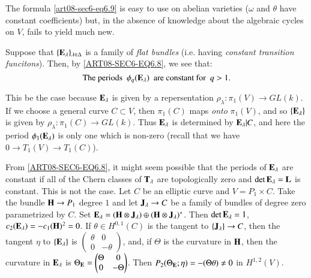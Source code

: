 \begin{remark*}
The formula \eqref{art08-sec6-eq6.9} is easy to use on abelian varieties ($\omega$ and $\theta$ have constant coefficients) but, in the absence of knowledge about the algebraic cycles on $V$, fails to yield much new.
\end{remark*}

\setcounter{definition}{1}
\begin{example}\label{art08-sec6-exam2}
Suppose that $\{\mathbf{E}_{\lambda}\}_{\lambda\in \Delta}$ is a family of {\em flat bundles} (i.e. having {\em constant transition funcitons}). Then, by \eqref{ART08-SEC6-EQ6.8}, we see that:
\begin{equation}
\text{The periods~ } \phi_{q}(\mathbf{E}_{\lambda})\text{~ are constant for~ } q>1.\label{art08-sec6-eq6.10}
\end{equation}
\end{example}

\begin{remark*}
This be the case because $\mathbf{E}_{\lambda}$ is given by a repersentation $\rho_{\lambda}:\pi_{1}(V)\to GL(k)$. If we choose a general curve $C\subset V$, then $\pi_{1}(C)$ maps {\em onto} $\pi_{1}(V)$, and so $\{\mathbf{E}_{\lambda}\}$ is given by $\rho_{\lambda}:\pi_{1}(C)\to GL(k)$. Thus $\mathbf{E}_{\lambda}$ is determined by $\mathbf{E}_{\lambda}|C$, and here the period $\phi_{1}(\mathbf{E}_{\lambda})$ is only one which is non-zero (recall that we have $0\to T_{1}(V)\to T_{1}(C)$).
\end{remark*}

\begin{example}\label{art08-sec6-exam3}
From \eqref{ART08-SEC6-EQ6.8}, it might seem possible that the periods of $\mathbf{E}_{\lambda}$ are constant if all of the Chern classes of $\mathbf{T}_{\lambda}$ are topologically zero and $\det \mathbf{E}_{\lambda}=\mathbf{L}$ is constant. This is not the case. Let $C$ be an elliptic curve and $V=P_{1}\times C$. Take the bundle $\mathbf{H}\to P_{1}$ degree $1$ and let $\mathbf{J}_{\lambda}\to C$ be a family of bundles of degree zero parametrized by $C$. Set $\mathbf{E}_{\lambda}=(\mathbf{H}\otimes \mathbf{J}_{\lambda})\oplus (\mathbf{H}\otimes \mathbf{J}_{\lambda})^{*}$. Then $\det \mathbf{E}_{\lambda}=1$, $c_{2}(\mathbf{E}_{\lambda})=-c_{1}(\mathbf{H})^{2}=0$. If $\theta\in H^{0,1}(C)$ is the tangent to $\{\mathbf{J}_{\lambda}\}\to C$, then the tangent $\eta$ to $\{\mathbf{E}_{\lambda}\}$ is $\left(\begin{matrix} \theta & 0\\ 0 & -\theta\end{matrix}\right)$, and, if $\Theta$ is the curvature in $\mathbf{H}$, then the curvature in $\mathbf{E}_{\lambda}$ is $\Theta_{\mathbf{E}}=\left(\begin{matrix} \Theta & 0\\ 0 & -\Theta\end{matrix}\right)$. Then $P_{2}(\Theta_{\mathbf{E}};\eta)=-(\Theta\theta)\neq 0$ in $H^{1,2}(V)$.
\end{example}

